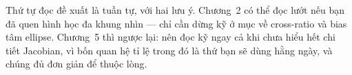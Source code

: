 \documentclass[../marker.tex]{subfiles}
\begin{document}
Thứ tự đọc đề xuất là tuần tự, với hai lưu ý. Chương~2 có thể đọc lướt nếu bạn đã quen hình học đa khung nhìn --- chỉ cần dừng kỹ ở mục về cross-ratio và bias tâm ellipse. Chương~5 thì ngược lại: nên đọc kỹ ngay cả khi chưa hiểu hết chi tiết Jacobian, vì bốn quan hệ tỉ lệ trong đó là thứ bạn sẽ dùng hằng ngày, và chúng đủ đơn giản để thuộc lòng.







\ifSubfilesClassLoaded{\printbibliography[title={Nguồn}]}{}
\end{document}
